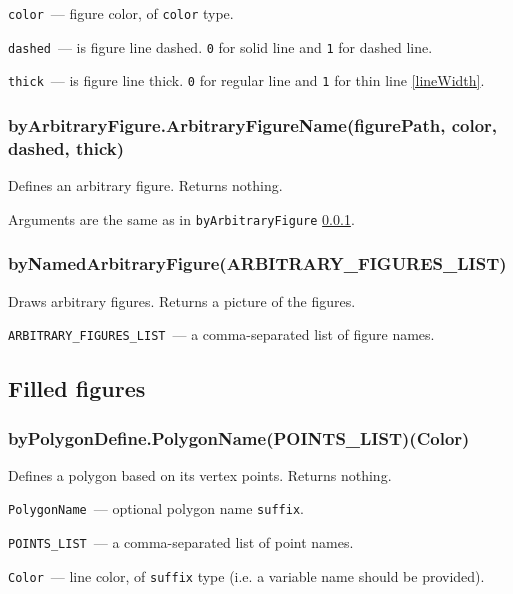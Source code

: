 	\texttt{color}~— figure color, of \texttt{color} type.
	
	\texttt{dashed}~— is figure line dashed. \texttt{0} for solid line and \texttt{1} for dashed line.
	
	\texttt{thick}~— is figure line thick. \texttt{0} for regular line and \texttt{1} for thin line \ref{lineWidth}.

\subsubsection{byArbitraryFigure.ArbitraryFigureName(figurePath, color, dash\-ed, thick)}\label{byArbitraryFigure}

	Defines an arbitrary figure. Returns nothing.
	
	Arguments are the same as in \texttt{byArbitraryFigure} \ref{byArbitraryFigure}.

\subsubsection{byNamedArbitraryFigure(ARBITRARY\_FIGURES\_LIST)}\label{byNamedArbitraryFigure}

	Draws arbitrary figures. Returns a picture of the figures.
	
	\texttt{ARBITRARY\_FIGURES\_LIST}~— a comma-separated list of figure names.


\subsection{Filled figures}


\subsubsection{byPolygonDefine.PolygonName(POINTS\_LIST)(Color)}\label{byPolygonDefine}

	Defines a polygon based on its vertex points. Returns nothing.
	
	\texttt{PolygonName}~— optional polygon name \texttt{suffix}.
	
	\texttt{POINTS\_LIST}~— a comma-separated list of point names.
	
	\texttt{Color}~— line color, of \texttt{suffix} type (i.e. a variable name should be provided).

